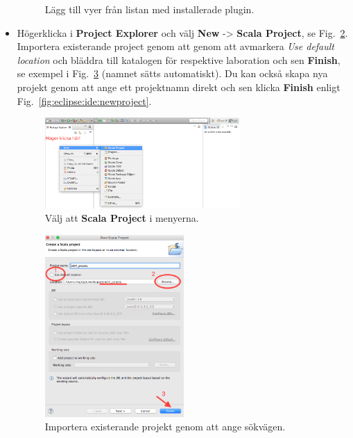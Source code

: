 \begin{itemize}
\begin{figure}[H]
\caption {Lägg till vyer från listan med installerade plugin.}
\label{fig:eclipse:ide:changeview}
\end{figure}

\item Högerklicka i {\bf Project Explorer} och välj {\bf New} -> {\bf Scala Project}, se Fig.~\ref{fig:eclipse:ide:createproject}. Importera existerande project genom att genom att avmarkera \emph{Use default location} och bläddra till katalogen för respektive laboration och sen {\bf Finish}, se exempel i Fig.~\ref{fig:eclipse:ide:import} (namnet sätts automatiskt). Du kan också skapa nya projekt genom att ange ett projektnamn direkt och sen klicka {\bf Finish} enligt Fig.~\ref{fig:eclipse:ide:newproject}.

\begin{figure}[H]
\centering
\includegraphics[width=0.7\textwidth]{../img/pirates/createproject.png} 

\caption {Välj att {\bf Scala Project} i menyerna.}
\label{fig:eclipse:ide:createproject}
\end{figure}
\begin{figure}[H]
\centering
\includegraphics[width=0.5\textwidth]{../img/pirates/importproject.png} 

\caption {Importera existerande projekt genom att ange sökvägen.}
\label{fig:eclipse:ide:import}
\end{figure}


\end{itemize}
